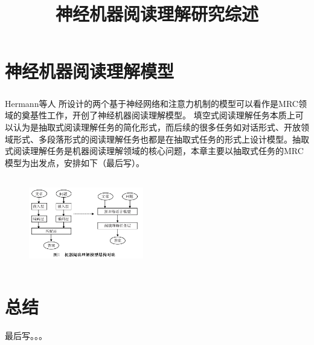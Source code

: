 \documentclass{article}
\title{\heiti \zihao{2} 神经机器阅读理解研究综述}
\date{}
\newcommand{\upcite}[1]{\textsuperscript{\textsuperscript{\cite{#1}}}}
\begin{document}
    \maketitle %

        



\section{神经机器阅读理解模型}
Hermann等人\upcite{Hermann}%
所设计的两个基于神经网络和注意力机制的模型可以看作是MRC领域的奠基性工作，开创了神经机器阅读理解模型。
填空式阅读理解任务本质上可以认为是抽取式阅读理解任务的简化形式，而后续的很多任务如对话形式、开放领域形式、多段落形式的阅读理解任务也都是在抽取式任务的形式上设计模型。抽取式阅读理解任务是机器阅读理解领域的核心问题，本章主要以抽取式任务的MRC模型为出发点，安排如下（最后写）。

\begin{figure}
	\centering
	\includegraphics[width=5cm,height=4cm]{classicTopre}
\end{figure}



\section{总结}
最后写。。。



\end{document}
